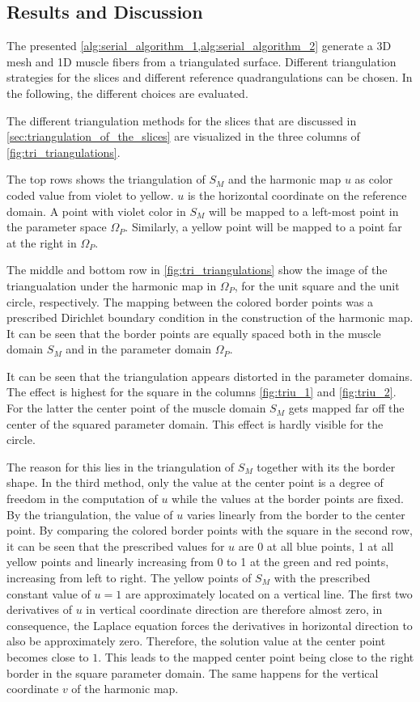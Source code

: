 \subsection{Results and Discussion}
The presented \cref{alg:serial_algorithm_1,alg:serial_algorithm_2} generate a 3D mesh and 1D muscle fibers from a triangulated surface. Different triangulation strategies for the slices and different reference quadrangulations can be chosen. In the following, the different choices are evaluated.

The different triangulation methods for the slices that are discussed in \cref{sec:triangulation_of_the_slices} are visualized in the three columns of \cref{fig:tri_triangulations}. 

The top rows shows the triangulation of $S_M$ and the harmonic map $u$ as color coded value from violet to yellow. $u$ is the horizontal coordinate on the reference domain. A point with violet color in $S_M$ will be mapped to a left-most point in the parameter space $\Omega_P$. Similarly, a yellow point will be mapped to a point far at the right in $\Omega_P$.

The middle and bottom row in \cref{fig:tri_triangulations} show the image of the triangualation under the harmonic map in $\Omega_P$, for the unit square and the unit circle, respectively. The mapping between the colored border points was a prescribed Dirichlet boundary condition in the construction of the harmonic map. It can be seen that the border points are equally spaced both in the muscle domain $S_M$ and in the parameter domain $\Omega_P$.

It can be seen that the triangulation appears distorted in the parameter domains. The effect is highest for the square in the columns \cref{fig:triu_1} and \cref{fig:triu_2}. For the latter the center point of the muscle domain $S_M$ gets mapped far off the center of the squared parameter domain. This effect is hardly visible for the circle.

The reason for this lies in the triangulation of $S_M$ together with its the border shape. In the third method, only the value at the center point is a degree of freedom in the computation of $u$ while the values at the border points are fixed. By the triangulation, the value of $u$ varies linearly from the border to the center point.
By comparing the colored border points with the square in the second row, it can be seen that the prescribed values for $u$ are 0 at all blue points, 1 at all yellow points and linearly increasing from 0 to 1 at the green and red points, increasing from left to right.
The yellow points of $S_M$ with the prescribed constant value of $u=1$ are approximately located on a vertical line. The first two derivatives of $u$ in vertical coordinate direction are therefore almost zero, in consequence, the Laplace equation forces the derivatives in horizontal direction to also be approximately zero. Therefore, the solution value at the center point becomes close to $1$. This leads to the mapped center point being close to the right border in the square parameter domain. The same happens for the vertical coordinate $v$ of the harmonic map.

